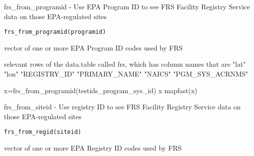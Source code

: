 \documentclass[a4paper]{book}
\begin{document}
%
\begin{Description}\relax
frs\_from\_programid - Use EPA Program ID to see FRS Facility Registry Service data on those EPA-regulated sites
\end{Description}
%
\begin{Usage}
\begin{verbatim}
frs_from_programid(programid)
\end{verbatim}
\end{Usage}
%
\begin{Arguments}
\begin{ldescription}
\item[\code{siteid}] vector of one or more EPA Program ID codes used by FRS
\end{ldescription}
\end{Arguments}
%
\begin{Value}
relevant rows of the data.table called frs, which has column names that are
"lat" "lon" "REGISTRY\_ID" "PRIMARY\_NAME" "NAICS" "PGM\_SYS\_ACRNMS"
\end{Value}
%
\begin{Examples}
\begin{ExampleCode}
x=frs_from_programid(testids_program_sys_id)
  x
  mapfast(x)
\end{ExampleCode}
\end{Examples}
%
\begin{Description}\relax
frs\_from\_siteid - Use registry ID to see FRS Facility Registry Service data on those EPA-regulated sites
\end{Description}
%
\begin{Usage}
\begin{verbatim}
frs_from_regid(siteid)
\end{verbatim}
\end{Usage}
%
\begin{Arguments}
\begin{ldescription}
\item[\code{siteid}] vector of one or more EPA Registry ID codes used by FRS
\end{ldescription}
\end{Arguments}
\end{document}

